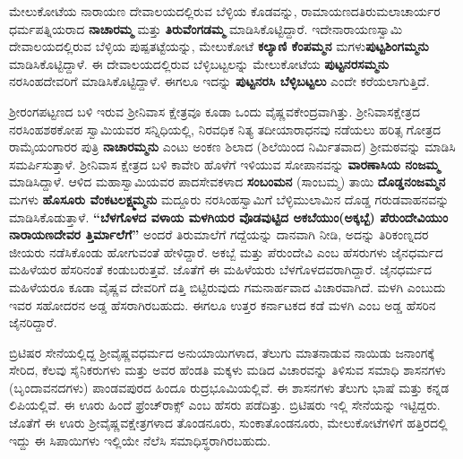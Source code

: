 ಮೇಲುಕೋಟೆಯ ನಾರಾಯಣ ದೇವಾಲಯದಲ್ಲಿರುವ ಬೆಳ್ಳಿಯ ಕೊಡವನ್ನು, ರಾಮಾಯಣದ\break ತಿರುಮಲಾಚಾರ್ಯರ ಧರ್ಮಪತ್ನಿಯರಾದ \textbf{ನಾಚಾರಮ್ಮ} ಮತ್ತು \textbf{ತಿರುವೆಂಗಡಮ್ಮ} ಮಾಡಿಸಿಕೊಟ್ಟಿದ್ದಾರೆ. ಇದೇ\break ನಾರಾಯಣಸ್ವಾಮಿ ದೇವಾಲಯದಲ್ಲಿರುವ ಬೆಳ್ಳಿಯ ಪುಷ್ಪತಟ್ಟೆಯನ್ನು, ಮೇಲುಕೋಟೆ \textbf{ಕಲ್ಯಾಣಿ ಕೆಂಪಮ್ಮನ} ಮಗಳು\break \textbf{ಪುಟ್ಟಶಿಂಗಮ್ಮನು} ಮಾಡಿಸಿಕೊಟ್ಟಿದ್ದಾಳೆ. ಈ ದೇವಾಲಯದಲ್ಲಿರುವ ಬೆಳ್ಳಿಬಟ್ಟಲನ್ನು ಮೇಲುಕೋಟೆಯ \textbf{ಪುಟ್ಟನರಸಮ್ಮನು} ನರಸಿಂಹದೇವರಿಗೆ ಮಾಡಿಸಿಕೊಟ್ಟಿದ್ದಾಳೆ. ಈಗಲೂ ಇದನ್ನು \textbf{ಪುಟ್ಟನರಸಿ ಬೆಳ್ಳಿಬಟ್ಟಲು} ಎಂದೇ ಕರೆಯಲಾಗುತ್ತಿದೆ.

ಶ‍್ರೀರಂಗಪಟ್ಟಣದ ಬಳಿ ಇರುವ ಶ‍್ರೀನಿವಾಸ ಕ್ಷೇತ್ರವೂ ಕೂಡಾ ಒಂದು ವೈಷ್ಣವಕೇಂದ್ರವಾಗಿತ್ತು. ಶ‍್ರೀನಿವಾಸಕ್ಷೇತ್ರದ ನರಸಿಂಹಶಠಕೋಪ ಸ್ವಾಮಿಯವರ ಸನ್ನಿಧಿಯಲ್ಲಿ, ನಿರವಧಿಕ ನಿತ್ಯ ತದೀಯಾರಾಧನವು ನಡೆಯಲು ಹರಿತ್ಸ ಗೋತ್ರದ ರಾಮೈಯಂಗಾರರ ಪುತ್ರಿ \textbf{ನಾಚಾರಮ್ಮನು} ಎಂಟು ಅಂಕಣ ಶಿಲಾದ (ಶಿಲೆಯಿಂದ ನಿರ್ಮಿತವಾದ) ಶ‍್ರೀಮಠವನ್ನು ಮಾಡಿಸಿ ಸಮರ್ಪಿಸುತ್ತಾಳೆ. ಶ‍್ರೀನಿವಾಸ ಕ್ಷೇತ್ರದ ಬಳಿ ಕಾವೇರಿ ಹೊಳೆಗೆ ಇಳಿಯುವ ಸೋಪಾನವನ್ನು \textbf{ವಾರಣಾಸಿಯ ನಂಜಮ್ಮ} ಮಾಡಿಸಿದ್ದಾಳೆ. ಆಳಿದ ಮಹಾಸ್ವಾಮಿಯವರ ಪಾದಸೇವಕಳಾದ \textbf{ಸಂಬಂಮನ} (ಸಾಂಬಮ್ಮ) ತಾಯಿ \textbf{ದೊಡ್ಡನಂಜಮ್ಮನ} ಮಗಳು \textbf{ಹೊಸೂರು ವೆಂಕಟಲಕ್ಷ್ಮಮ್ಮನು} ಮದ್ದೂರು ನರಸಿಂಹಸ್ವಾಮಿಗೆ ಬೆಳ್ಳಿಮುಲಾಮಿನ ದೊಡ್ಡ ಗರುಡವಾಹನವನ್ನು ಮಾಡಿಸಿಕೊಡುತ್ತಾಳೆ.\textbf{ “ಬೆಳಗೊಳದ ವಳಾಯ ಮಳಗಿಯರ ವೊಡವುಟ್ಟಿದ ಅಕಬೆಯುಂ(ಅಕ್ಕಬ್ಬೆ) ಪೆರುಂದೇವಿಯುಂ\general{\break } ನಾರಾಯಣದೇವರ ತ್ತಿರ್ಮಾಲೆಗೆ”} ಅಂದರೆ ತಿರುಮಾಲೆಗೆ ಗದ್ದೆಯನ್ನು ದಾನವಾಗಿ ನೀಡಿ, ಅದನ್ನು ತಿರಿಕಂಣ್ನದರ ಜೀಯರು ನಡೆಸಿಕೊಂಡು ಹೋಗುವಂತೆ ಹೇಳಿದ್ದಾರೆ. ಅಕಬ್ಬೆ ಮತ್ತು ಪೆರುಂದೇವಿ ಎಂಬ ಹೆಸರುಗಳು ಜೈನಧರ್ಮದ ಮಹಿಳೆಯರ ಹೆಸರಿನಂತೆ ಕಂಡುಬರುತ್ತವೆ. ಜೊತೆಗೆ ಈ ಮಹಿಳೆಯರು ಬೆಳಗೊಳದವರಾಗಿದ್ದಾರೆ. ಜೈನಧರ್ಮದ ಮಹಿಳೆಯರೂ ಕೂಡಾ ವೈಷ್ಣವ ದೇವರಿಗೆ ದತ್ತಿ ಬಿಟ್ಟಿರುವುದು ಗಮನಾರ್ಹವಾದ ವಿಚಾರವಾಗಿದೆ. ಮಳಗಿ ಎಂಬುದು ಇವರ ಸಹೋದರನ ಅಡ್ಡ ಹೆಸರಾಗಿರಬಹುದು. ಈಗಲೂ ಉತ್ತರ ಕರ್ನಾಟಕದ ಕಡೆ ಮಳಗಿ ಎಂಬ ಅಡ್ಡ ಹೆಸರಿನ ಜೈನರಿದ್ದಾರೆ.

ಬ್ರಿಟಿಷರ ಸೇನೆಯಲ್ಲಿದ್ದ ಶ‍್ರೀವೈಷ್ಣವಧರ್ಮದ ಅನುಯಾಯಿಗಳಾದ, ತೆಲುಗು ಮಾತನಾಡುವ ನಾಯಿಡು ಜನಾಂಗಕ್ಕೆ ಸೇರಿದ, ಕೆಲವು ಸೈನಿಕರುಗಳು ಮತ್ತು ಅವರ ಹೆಂಡತಿ ಮಕ್ಕಳು ಮಡಿದ ವಿಚಾರವನ್ನು ತಿಳಿಸುವ ಸಮಾಧಿ ಶಾಸನಗಳು (ಬೃಂದಾವನದಗಳು) ಪಾಂಡವಪುರದ ಹಿಂದೂ ರುದ್ರಭೂಮಿಯಲ್ಲಿವೆ. ಈ ಶಾಸನಗಳು ತೆಲುಗು ಭಾಷೆ ಮತ್ತು ಕನ್ನಡ ಲಿಪಿಯಲ್ಲಿವೆ. ಈ ಊರು ಹಿಂದೆ ಫ್ರೆಂಚ್​ರಾಕ್ಸ್​ ಎಂಬ ಹೆಸರು ಪಡೆದಿತ್ತು. ಬ್ರಿಟಿಷರು ಇಲ್ಲಿ ಸೇನೆಯನ್ನು ಇಟ್ಟಿದ್ದರು. ಜೊತೆಗೆ ಈ ಊರು ಶ‍್ರೀವೈಷ್ಣವಕ್ಷೇತ್ರಗಳಾದ ತೊಂಡನೂರು, ಸುಂಕಾತೊಂಡನೂರು, ಮೇಲುಕೋಟೆಗಳಿಗೆ ಹತ್ತಿರದಲ್ಲಿ ಇದ್ದು ಈ ಸಿಪಾಯಿಗಳು ಇಲ್ಲಿಯೇ ನೆಲೆಸಿ ಸಮಾಧಿಸ್ಥರಾಗಿರಬಹುದು.

